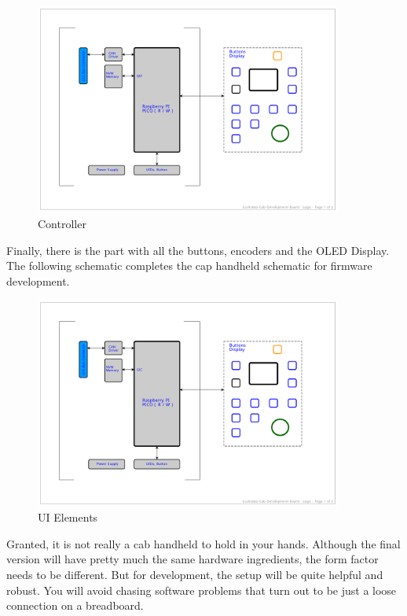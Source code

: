 \begin{figure}[htbp]
    \centering
    \includegraphics[page=2, width=0.9\textwidth]{./Schematics/Schematic_LcsNodes-Cab-Dev.pdf}
    \caption{Controller}
\end{figure}
\FloatBarrier

Finally, there is the part with all the buttons, encoders and the OLED Display. The following schematic completes the cap handheld schematic for firmware development.

\begin{figure}[htbp]
    \centering
    \includegraphics[page=3, width=0.9\textwidth]{./Schematics/Schematic_LcsNodes-Cab-Dev.pdf}
    \caption{UI Elements}
\end{figure}
\FloatBarrier

Granted, it is not really a cab handheld to hold in your hands. Although the final version will have pretty much the same hardware ingredients, the form factor needs to be different. But for development, the setup will be quite helpful and robust. You will avoid chasing software problems that turn out to be just a loose connection on a breadboard. 

